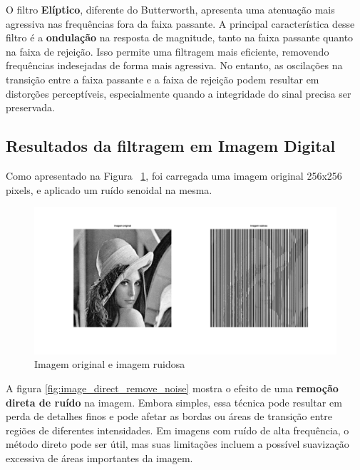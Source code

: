 O filtro \textbf{Elíptico}, diferente do Butterworth, apresenta uma atenuação mais agressiva nas frequências fora da faixa passante. A principal característica desse filtro é a \textbf{ondulação} na resposta de magnitude, tanto na faixa passante quanto na faixa de rejeição. Isso permite uma filtragem mais eficiente, removendo frequências indesejadas de forma mais agressiva. No entanto, as oscilações na transição entre a faixa passante e a faixa de rejeição podem resultar em distorções perceptíveis, especialmente quando a integridade do sinal precisa ser preservada.

\subsection{Resultados da filtragem em Imagem Digital}
Como apresentado na Figura ~\ref{fig:image_original_plus_noise}, foi carregada uma imagem original 256x256 pixels, e aplicado um ruído senoidal na mesma.

\begin{figure}[H]
    \centering
    \includegraphics[width=1\linewidth]{03_results/assets/image_original_plus_noise.png}
    \caption{Imagem original e imagem ruidosa}
    \label{fig:image_original_plus_noise}
\end{figure}

A figura \ref{fig:image_direct_remove_noise} mostra o efeito de uma \textbf{remoção direta de ruído} na imagem. Embora simples, essa técnica pode resultar em perda de detalhes finos e pode afetar as bordas ou áreas de transição entre regiões de diferentes intensidades. Em imagens com ruído de alta frequência, o método direto pode ser útil, mas suas limitações incluem a possível suavização excessiva de áreas importantes da imagem.

